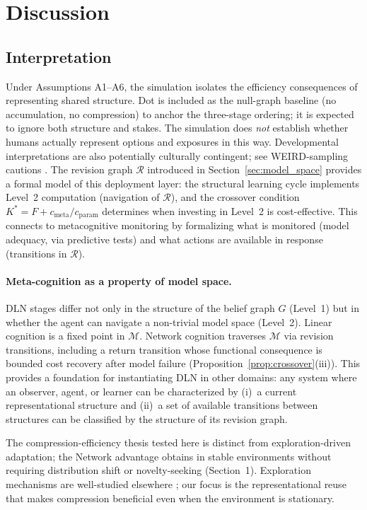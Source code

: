 \documentclass[11pt]{article}
\begin{document}
\section{Discussion}

\subsection{Interpretation}

Under Assumptions A1--A6, the simulation isolates the efficiency consequences of representing shared structure. Dot is included as the null-graph baseline (no accumulation, no compression) to anchor the three-stage ordering; it is expected to ignore both structure and stakes. The simulation does \emph{not} establish whether humans actually represent options and exposures in this way. Developmental interpretations are also potentially culturally contingent; see WEIRD-sampling cautions \cite{Henrich2010}. The revision graph $\mathcal{R}$ introduced in Section~\ref{sec:model_space} provides a formal model of this deployment layer: the structural learning cycle implements Level~2 computation (navigation of $\mathcal{R}$), and the crossover condition $K^* = F + c_{\mathrm{meta}}/c_{\mathrm{param}}$ determines when investing in Level~2 is cost-effective.  This connects to metacognitive monitoring \cite{Flavell1979,Bandura1997} by formalizing what is monitored (model adequacy, via predictive tests) and what actions are available in response (transitions in $\mathcal{R}$).

\paragraph{Meta-cognition as a property of model space.}
DLN stages differ not only in the structure of the belief graph $G$ (Level~1) but
in whether the agent can navigate a non-trivial model space (Level~2).  Linear
cognition is a fixed point in $\mathcal{M}$.  Network cognition traverses
$\mathcal{M}$ via revision transitions, including a return transition whose
functional consequence is bounded cost recovery after model failure
(Proposition~\ref{prop:crossover}(iii)).  This provides a foundation for
instantiating DLN in other domains: any system where an observer, agent, or
learner can be characterized by (i)~a current representational structure and
(ii)~a set of available transitions between structures can be classified by
the structure of its revision graph.


The compression-efficiency thesis tested here is distinct from exploration-driven adaptation; the Network advantage obtains in stable environments without requiring distribution shift or novelty-seeking (Section~1). Exploration mechanisms are well-studied elsewhere \cite{Gershman2018,RussoBandits2018}; our focus is the representational reuse that makes compression beneficial even when the environment is stationary.
\end{document}
